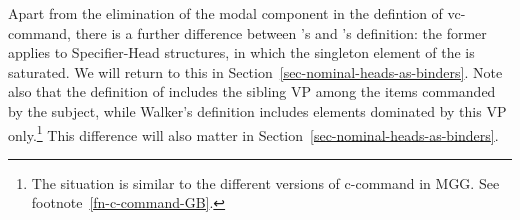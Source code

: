 \documentclass[output=paper,biblatex,babelshorthands,newtxmath,draftmode,colorlinks,citecolor=brown]{langscibook}
\begin{document}

Apart from the elimination of the modal component in the defintion of vc-command, there is a further
difference between \citeauthor{HL95b}'s and \citeauthor{Walker2011a}'s definition: the former
applies to Specifier-Head structures, in which the singleton element of the \sprl is saturated. We
will return to this in Section~\ref{sec-nominal-heads-as-binders}. Note also that the definition of
\citeauthor{HL95b} includes the sibling VP among the items commanded by the subject, while Walker's
definition includes elements dominated by this VP only.\footnote{%
  The situation is similar to the different versions of c-command in MGG. See footnote~\ref{fn-c-command-GB}.
}
This difference will also matter in Section~\ref{sec-nominal-heads-as-binders}.
\end{document}
